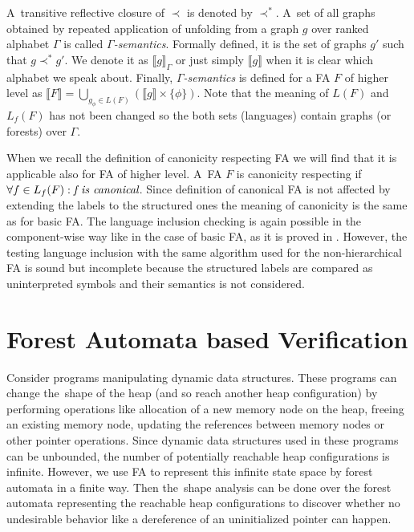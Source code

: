A~transitive reflective closure of $\prec$ is denoted by $\prec^*$.
A~set of all graphs obtained by repeated application of unfolding from
a graph $g$ over ranked alphabet $\Gamma$ is called \emph{$\Gamma$-semantics}. 
Formally defined, it is the set of graphs $g'$ such that $g \prec^* g'$.
We denote it as $\llbracket g \rrbracket_\Gamma$ or just simply $\llbracket g \rrbracket$ when it is
clear which alphabet we speak about.
Finally, \emph{$\Gamma$-semantics} is defined for a FA $F$ of higher level as
$\llbracket F \rrbracket = \bigcup_{g_\phi \in L(F)} (\llbracket g \rrbracket \times \{\phi\})$.
Note that the meaning of $L(F)$ and $L_f(F)$ has not been changed
so the both sets (languages) contain graphs (or forests) over $\Gamma$.

When we recall the definition of canonicity respecting FA we will find that it is applicable also for FA of higher level.
A~FA $F$ is canonicity respecting if $\forall f \in L_f(F): \emph{f is canonical}$.
Since definition of canonical FA is not affected by extending the labels to the structured ones the meaning of canonicity is the same as for basic FA.
The language inclusion checking is again possible in the component-wise way like in the case of basic FA, as it is
proved in \cite{forester:techrep}.
However, the testing language inclusion with the same algorithm used for the non-hierarchical FA
is sound but incomplete because the structured labels are compared as uninterpreted symbols and their semantics
is not considered.


\chapter{Forest Automata based Verification}
\label{ch:fav}

Consider programs manipulating dynamic data structures.
These programs can change the~shape of the heap (and so reach another heap configuration)
by performing operations like allocation of a new memory node on the heap,
freeing an existing memory node, updating the references between memory nodes
or other pointer operations.
Since dynamic data structures used in these programs can be
unbounded, the number of potentially reachable heap configurations is infinite.
However, we use FA to represent this infinite state space by forest automata in a finite way.
Then the~shape analysis can be done over the forest automata representing the reachable
heap configurations to discover whether no undesirable behavior
like a dereference of an uninitialized pointer can happen.

